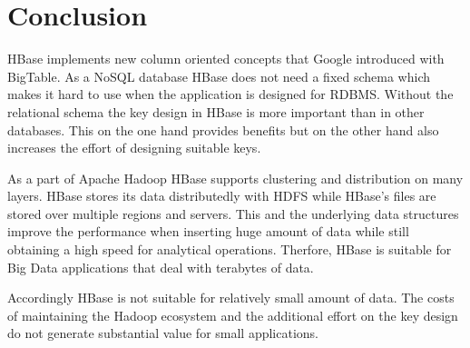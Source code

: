 
\chapter{Conclusion}
HBase implements new column oriented concepts that Google introduced with BigTable. As a NoSQL database HBase does not need a fixed schema which makes it hard to use when the application is designed for RDBMS. Without the relational schema the key design in HBase is more important than in other databases. This on the one hand provides benefits but on the other hand also increases the effort of designing suitable keys. 

As a part of Apache Hadoop HBase supports clustering and distribution on many layers. HBase stores its data distributedly with HDFS while HBase's files are stored over multiple regions and servers. This and the underlying data structures improve the performance when inserting huge amount of data while still obtaining a high speed for analytical operations. Therfore, HBase is suitable for Big Data applications that deal with terabytes of data. 

Accordingly HBase is not suitable for relatively small amount of data. The costs of maintaining the Hadoop ecosystem and the additional effort on the key design do not generate substantial value for small applications.


